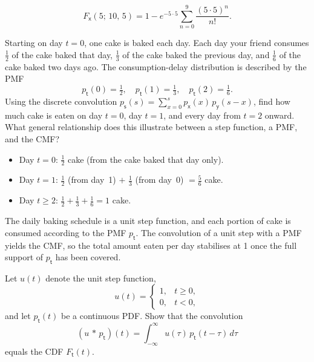 \begin{solution}
    \[
        F_{\mathsf{x}}(5;\, 10,\, 5)
        = 1 - e^{-5 \cdot 5}
          \sum_{n=0}^{9} \frac{(5 \cdot 5)^{n}}{n!}.
    \]
    
\end{solution}

\begin{exercise} %
    Starting on day $t = 0$, one cake is baked each day. Each day your friend consumes $\tfrac{1}{2}$ of the cake baked that day, $\tfrac{1}{3}$ of the cake baked the previous day, and $\tfrac{1}{6}$ of the cake baked two days ago. The consumption-delay distribution is
    described by the PMF
    \[
        p_{\mathsf{t}}(0) = \tfrac{1}{2}, \quad
        p_{\mathsf{t}}(1) = \tfrac{1}{3}, \quad
        p_{\mathsf{t}}(2) = \tfrac{1}{6}.
    \]
    Using the discrete convolution $p_{\mathsf{s}}(s) = \sum_{x=0}^{s} p_{\mathsf{x}}(x)\, p_{\mathsf{y}}(s-x)$, find how much cake is eaten on day $t = 0$, day $t = 1$, and every day from $t = 2$ onward. What general relationship does this illustrate between a step function, a PMF, and the CMF?
\end{exercise}

\begin{solution}
    \begin{itemize}
        \item Day $t = 0$: $\tfrac{1}{2}$ cake (from the cake baked that
              day only).
        \item Day $t = 1$: $\tfrac{1}{2}$ (from day~1) $+$ $\tfrac{1}{3}$
              (from day~0) $= \tfrac{5}{6}$ cake.
        \item Day $t \geq 2$: $\tfrac{1}{2} + \tfrac{1}{3} + \tfrac{1}{6}
              = 1$ cake.
    \end{itemize}
    The daily baking schedule is a unit step function, and each portion of cake is consumed according to the PMF $p_{\mathsf{t}}$. The convolution of a unit step with a PMF yields the CMF, so the total amount eaten per day stabilises at 1 once the full support of $p_{\mathsf{t}}$ has been covered.
\end{solution}

\begin{exercise} %
    Let $u(t)$ denote the unit step function,
    \[
        u(t) =
        \begin{cases}
            1, & t \geq 0, \\
            0, & t < 0,
        \end{cases}
    \]
    and let $p_{\mathsf{t}}(t)$ be a continuous PDF. Show that the convolution
    \[
        (u\,{*}\,p_{\mathsf{t}})(t)
        = \int_{-\infty}^{\infty} u(\tau)\, p_{\mathsf{t}}(t-\tau)\, d\tau
    \]
    equals the CDF $F_{\mathsf{t}}(t)$.
\end{exercise}

